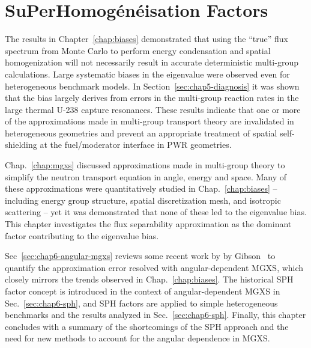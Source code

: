 \chapter{SuPerHomog\'{e}n\'{e}isation Factors}
\label{chap:sph}

The results in Chapter~\ref{chap:biases} demonstrated that using the ``true'' flux spectrum from Monte Carlo to perform energy condensation and spatial homogenization will not necessarily result in accurate deterministic multi-group calculations. Large systematic biases in the eigenvalue were observed even for heterogeneous benchmark models. In Section~\ref{sec:chap5-diagnosis} it was shown that the bias largely derives from errors in the multi-group reaction rates in the large thermal U-238 capture resonances. These results indicate that one or more of the approximations made in multi-group transport theory are invalidated in heterogeneous geometries and prevent an appropriate treatment of spatial self-shielding at the fuel/moderator interface in \ac{PWR} geometries.



Chap.~\ref{chap:mgxs} discussed approximations made in multi-group theory to simplify the neutron transport equation in angle, energy and space. Many of these approximations were quantitatively studied in Chap.~\ref{chap:biases} -- including energy group structure, spatial discretization mesh, and isotropic scattering -- yet it was demonstrated that none of these led to the eigenvalue bias. This chapter investigates the flux separability approximation as the dominant factor contributing to the eigenvalue bias.

Sec~\ref{sec:chap6-angular-mgxs} reviews some recent work by by Gibson~\cite{gibson2016thesis} to quantify the approximation error resolved with angular-dependent \ac{MGXS}, which closely mirrors the trends observed in Chap.~\ref{chap:biases}. The historical \ac{SPH} factor concept is introduced in the context of angular-dependent \ac{MGXS} in Sec.~\ref{sec:chap6-sph}, and \ac{SPH} factors are applied to simple heterogeneous benchmarks and the results analyzed in Sec.~\ref{sec:chap6-sph}. Finally, this chapter concludes with a summary of the shortcomings of the \ac{SPH} approach and the need for new methods to account for the angular dependence in \ac{MGXS}.

